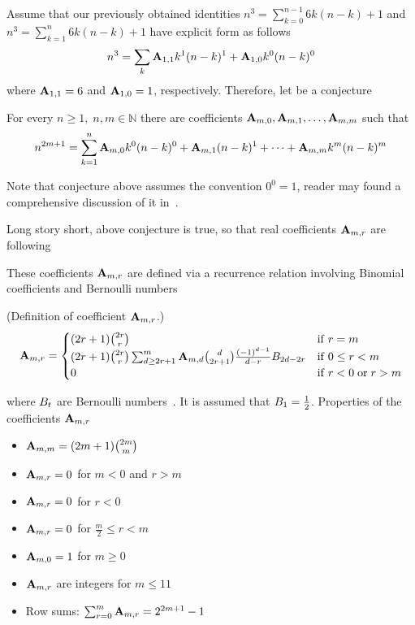 ﻿Assume that our previously obtained identities
$n^3 = \sum_{k=0}^{n-1} 6k(n-k) + 1$ and $n^3 = \sum_{k=1}^{n} 6k(n-k) + 1$
have explicit form as follows
\begin{align*}
    n^3 = \sum_{k} {\mathbf{A}} \sb{1,1} k^1(n-k)^1 + {\mathbf{A}} \sb{1,0} k^0(n-k)^0
\end{align*}
where ${\mathbf{A}} \sb{1,1} = 6$ and ${\mathbf{A}} \sb{1,0} = 1$, respectively.
Therefore, let be a conjecture
\begin{conjecture}
    \label{conj:generalization}
    For every $n\geq 1, \; n,m\in\mathbb{N}$ there are coefficients ${\mathbf{A}} \sb{m,0}, {\mathbf{A}} \sb{m,1}, \ldots, {\mathbf{A}} \sb{m,m}$ such that
    \begin{align*}
        n^{2m+1} = \sum_{k=1}^{n} {\mathbf{A}} \sb{m,0} k^0 (n-k)^0 + {\mathbf{A}} \sb{m,1} (n-k)^1
        + \cdots + {\mathbf{A}} \sb{m,m} k^m (n-k)^m
    \end{align*}
\end{conjecture}
Note that conjecture above assumes the convention $0^0=1$,
reader may found a comprehensive discussion of it in~\cite{knuth1992two}.

Long story short, above conjecture is true, so that real coefficients ${\mathbf{A}} \sb{m,r}$ are following

These coefficients ${\mathbf{A}} \sb{m,r}$ are defined via a recurrence relation involving Binomial coefficients
and Bernoulli numbers
\begin{definition} (Definition of coefficient ${\mathbf{A}} \sb{m,r}$.)
    \begin{align*}
        \label{eq:definition_coefficient_a}
        {\mathbf{A}} \sb{m,r} =
        \begin{cases}
        (2r+1)
            \binom{2r}{r} & \mathrm{if} \; r=m \\
            (2r+1) \binom{2r}{r} \sum_{d \geq 2r+1}^{m} {\mathbf{A}} \sb{m,d} \binom{d}{2r+1} \frac{(-1)^{d-1}}{d-r}
            {B}\sb{2d-2r} & \mathrm{if} \; 0 \leq r<m \\
            0 & \mathrm{if} \; r<0 \; \mathrm{or} \; r>m
        \end{cases}
    \end{align*}
\end{definition}
where ${B}\sb{t}$ are Bernoulli numbers~\cite{bateman1953higher}.
It is assumed that ${B}\sb{1}=\frac{1}{2}$.
Properties of the coefficients ${\mathbf{A}} \sb{m,r}$
\begin{itemize}
    \item ${\mathbf{A}} \sb{m,m} = (2m+1) \binom{2m}{m}$
    \item ${\mathbf{A}} \sb{m,r} = 0$ for $m < 0$ and $r > m$
    \item ${\mathbf{A}} \sb{m,r} = 0$ for $r < 0$
    \item ${\mathbf{A}} \sb{m,r} = 0$ for $\frac{m}{2} \leq r < m$
    \item ${\mathbf{A}} \sb{m,0} = 1$ for $m \geq 0$
    \item ${\mathbf{A}} \sb{m,r}$ are integers for $m \leq 11$
    \item Row sums: $\sum_{r=0}^{m} {\mathbf{A}} \sb{m,r} = 2^{2m+1} - 1$
\end{itemize}

